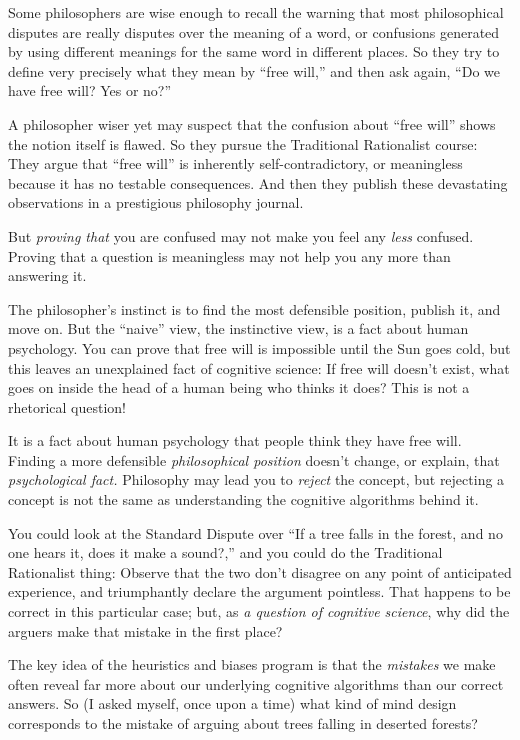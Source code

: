 {
 Some philosophers are wise enough to recall the warning that most
philosophical disputes are really disputes over the meaning of a word,
or confusions generated by using different meanings for the same word
in different places. So they try to define very precisely what they
mean by ``free will,'' and then ask
again, ``Do we have free will? Yes or
no?''}

{
 A philosopher wiser yet may suspect that the confusion about
``free will'' shows the notion
itself is flawed. So they pursue the Traditional Rationalist course:
They argue that ``free will'' is
inherently self-contradictory, or meaningless because it has no
testable consequences. And then they publish these devastating
observations in a prestigious philosophy journal.}

{
 But \textit{proving that} you are confused may not make you feel
any \textit{less} confused. Proving that a question is meaningless may
not help you any more than answering it.}

{
 The philosopher's instinct is to find the most
defensible position, publish it, and move on. But the
``naive'' view, the instinctive
view, is a fact about human psychology. You can prove that free will is
impossible until the Sun goes cold, but this leaves an unexplained fact
of cognitive science: If free will doesn't exist, what
goes on inside the head of a human being who thinks it does? This is
not a rhetorical question!}

{
 It is a fact about human psychology that people think they have
free will. Finding a more defensible \textit{philosophical position}
doesn't change, or explain, that \textit{psychological
fact.} Philosophy may lead you to \textit{reject} the concept, but
rejecting a concept is not the same as understanding the cognitive
algorithms behind it.}

{
 You could look at the Standard Dispute over ``If
a tree falls in the forest, and no one hears it, does it make a
sound?,'' and you could do the Traditional
Rationalist thing: Observe that the two don't disagree
on any point of anticipated experience, and triumphantly declare the
argument pointless. That happens to be correct in this particular case;
but, as \textit{a question of cognitive science}, why did the arguers
make that mistake in the first place?}

{
 The key idea of the heuristics and biases program is that the
\textit{mistakes} we make often reveal far more about our underlying
cognitive algorithms than our correct answers. So (I asked myself, once
upon a time) what kind of mind design corresponds to the mistake of
arguing about trees falling in deserted forests?}

